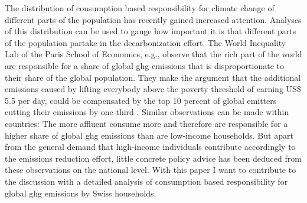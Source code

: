 \documentclass[a4paper,11pt,abstract=true]{scrartcl}
\begin{document}
The distribution of consumption based responsibility for climate change of different parts of the population has recently gained increased attention.
Analyses of this distribution can be used to gauge how important it is that different parts of the population partake in the decarbonization effort.
The World Inequality Lab of the Paris School of Economics, e.g., observe that the rich part of the world are responsible for a share of global \ac{ghg} emissions that is disproportionate to their share of the global population.
They make the argument that the additional emissions caused by lifting everybody above the poverty threshold of earning US\$ 5.5 per day, could be compensated by the top 10 percent of global emitters cutting their emissions by one third \citep{chancel_climate_2023}.
Similar observations can be made within countries:
The more affluent consume more and therefore are responsible for a higher share of global \ac{ghg} emissions than are low-income households.
But apart from the general demand that high-income individuals contribute accordingly to the emissions reduction effort, little concrete policy advice has been deduced from these observations on the national level.
With this paper I want to contribute to the discussion with a detailed analysis of consumption based responsibility for global \ac{ghg} emissions by Swiss households.
\end{document}
